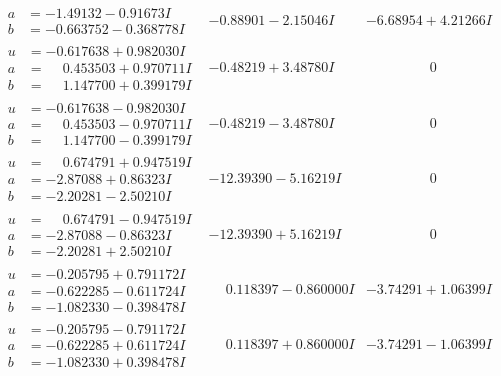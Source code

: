 \documentclass[1p]{elsarticle_modified}
\theoremstyle{definition}
\begin{document}
$$\begin{array}{c|c|c}
\begin{aligned}
a &= -1.49132 - 0.91673 I \\
b &= -0.663752 - 0.368778 I\end{aligned}
 & -0.88901 - 2.15046 I & -6.68954 + 4.21266 I \\ \hline\begin{aligned}
u &= -0.617638 + 0.982030 I \\
a &= \phantom{-}0.453503 + 0.970711 I \\
b &= \phantom{-}1.147700 + 0.399179 I\end{aligned}
 & -0.48219 + 3.48780 I & \phantom{-0.000000 } 0 \\ \hline\begin{aligned}
u &= -0.617638 - 0.982030 I \\
a &= \phantom{-}0.453503 - 0.970711 I \\
b &= \phantom{-}1.147700 - 0.399179 I\end{aligned}
 & -0.48219 - 3.48780 I & \phantom{-0.000000 } 0 \\ \hline\begin{aligned}
u &= \phantom{-}0.674791 + 0.947519 I \\
a &= -2.87088 + 0.86323 I \\
b &= -2.20281 - 2.50210 I\end{aligned}
 & -12.39390 - 5.16219 I & \phantom{-0.000000 } 0 \\ \hline\begin{aligned}
u &= \phantom{-}0.674791 - 0.947519 I \\
a &= -2.87088 - 0.86323 I \\
b &= -2.20281 + 2.50210 I\end{aligned}
 & -12.39390 + 5.16219 I & \phantom{-0.000000 } 0 \\ \hline\begin{aligned}
u &= -0.205795 + 0.791172 I \\
a &= -0.622285 - 0.611724 I \\
b &= -1.082330 - 0.398478 I\end{aligned}
 & \phantom{-}0.118397 - 0.860000 I & -3.74291 + 1.06399 I \\ \hline\begin{aligned}
u &= -0.205795 - 0.791172 I \\
a &= -0.622285 + 0.611724 I \\
b &= -1.082330 + 0.398478 I\end{aligned}
 & \phantom{-}0.118397 + 0.860000 I & -3.74291 - 1.06399 I \\ \hline\begin{aligned}

\end{aligned}
\end{array}$$
\end{document}
